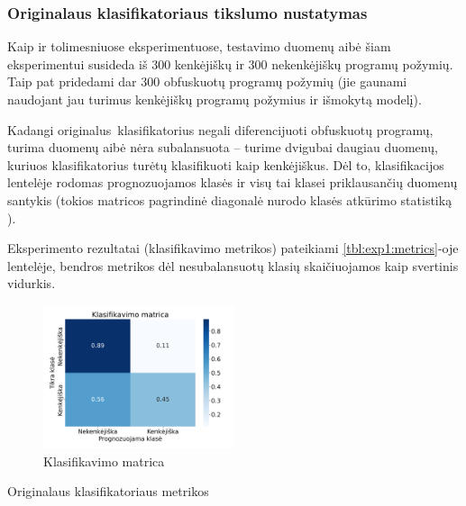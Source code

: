 \subsubsection{Originalaus klasifikatoriaus tikslumo nustatymas}\label{sec:exp:1}

Kaip ir tolimesniuose eksperimentuose, testavimo duomenų aibė šiam
eksperimentui susideda iš 300 kenkėjiškų ir 300 nekenkėjiškų programų požymių.
Taip pat pridedami dar 300 obfuskuotų programų požymių (jie gaunami naudojant
jau turimus kenkėjiškų programų požymius ir išmokytą \MALGAN modelį).

Kadangi originalus\footnotemark~klasifikatorius negali diferencijuoti
obfuskuotų programų, turima duomenų aibė nėra subalansuota -- turime dvigubai
daugiau duomenų, kuriuos klasifikatorius turėtų klasifikuoti kaip kenkėjiškus.
Dėl to, klasifikacijos lentelėje  rodomas prognozuojamos
klasės ir visų tai klasei priklausančių duomenų santykis (tokios matricos
pagrindinė diagonalė nurodo klasės atkūrimo statistiką ).

Eksperimento rezultatai (klasifikavimo metrikos) pateikiami
\ref{tbl:exp1:metrics}-oje lentelėje, bendros metrikos dėl nesubalansuotų klasių skaičiuojamos kaip svertinis vidurkis.
\begin{figure}[h]
    \centering
    \includegraphics[width=0.5\textwidth]{images/normal_2x2.png}
    \caption{Klasifikavimo matrica}
    \label{fig:exp1:confusion}
\end{figure}

\begin{table}[h]
    \caption{Originalaus klasifikatoriaus metrikos}
    \centering
    \label{tbl:exp1:metrics}
\end{table}

